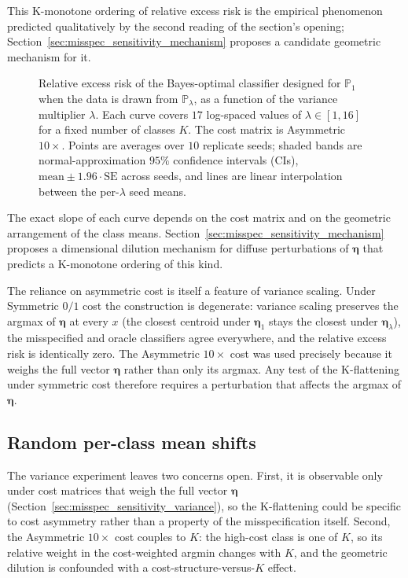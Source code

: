 This K-monotone ordering of relative excess risk is the empirical phenomenon predicted qualitatively by the second reading of the section's opening; Section~\ref{sec:misspec_sensitivity_mechanism} proposes a candidate geometric mechanism for it.

\begin{figure}[H]
    \centering
    
    \caption{Relative excess risk of the Bayes-optimal classifier designed for $\mathbb{P}_1$ when the data is drawn from $\mathbb{P}_\lambda$, as a function of the variance multiplier $\lambda$. Each curve covers $17$ log-spaced values of $\lambda \in [1, 16]$ for a fixed number of classes $K$. The cost matrix is Asymmetric $10\times$. Points are averages over $10$ replicate seeds; shaded bands are normal-approximation $95\%$ confidence intervals (CIs), $\mathrm{mean} \pm 1.96 \cdot \mathrm{SE}$ across seeds, and lines are linear interpolation between the per-$\lambda$ seed means.}%
    \label{fig:misspec-sensitivity-variance}
\end{figure}

The exact slope of each curve depends on the cost matrix and on the geometric arrangement of the class means. Section~\ref{sec:misspec_sensitivity_mechanism} proposes a dimensional dilution mechanism for diffuse perturbations of $\boldsymbol{\eta}$ that predicts a K-monotone ordering of this kind.

The reliance on asymmetric cost is itself a feature of variance scaling. Under Symmetric $0/1$ cost the construction is degenerate: variance scaling preserves the argmax of $\boldsymbol{\eta}$ at every $x$ (the closest centroid under $\boldsymbol{\eta}_1$ stays the closest under $\boldsymbol{\eta}_\lambda$), the misspecified and oracle classifiers agree everywhere, and the relative excess risk is identically zero. The Asymmetric $10\times$ cost was used precisely because it weighs the full vector $\boldsymbol{\eta}$ rather than only its argmax. Any test of the K-flattening under symmetric cost therefore requires a perturbation that affects the argmax of $\boldsymbol{\eta}$.

\subsection{Random per-class mean shifts}\label{sec:misspec_sensitivity_meanshift}

The variance experiment leaves two concerns open. First, it is observable only under cost matrices that weigh the full vector $\boldsymbol{\eta}$ (Section~\ref{sec:misspec_sensitivity_variance}), so the K-flattening could be specific to cost asymmetry rather than a property of the misspecification itself. Second, the Asymmetric $10\times$ cost couples to $K$: the high-cost class is one of $K$, so its relative weight in the cost-weighted argmin changes with $K$, and the geometric dilution is confounded with a cost-structure-versus-$K$ effect.

